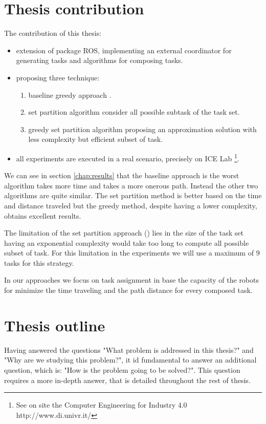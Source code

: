 \newpage
\section{Thesis contribution}
The contribution of this thesis:
\begin{itemize}
    \item extension of package ROS, implementing an external coordinator for generating tasks and algorithms for composing tasks.
    \item proposing three technique: 
    \begin{enumerate}
        \item baseline greedy approach \srst.
        \item set partition algorithm \sps consider all possible subtask of the task set.
        \item greedy set partition algorithm \gsp proposing an approximation solution with less complexity but efficient subset of task.
    \end{enumerate}
    \item all experiments are executed in a real scenario, precisely on ICE Lab \footnote{See on site the Computer Engineering for Industry 4.0 http://www.di.univr.it/}. 
\end{itemize}

We can see in section \ref{chap:results} that the baseline approach is
the worst algorithm takes more time and takes a more onerous path.
Instead the other two algorithms are quite similar. 
The set partition method is better based on the time and distance traveled but the greedy method,
despite having a lower complexity, obtains excellent results.

The limitation of the set partition approach (\sps) lies in the size of the task set having an exponential complexity
would take too long to compute all possible subset of task.
For this limitation in the experiments we will use a maximum of 9 tasks for this strategy. 

In our approaches we focus on task assignment in base the capacity of the robots for minimize the time traveling and the path distance for every composed task. 

\newpage
\section{Thesis outline}


Having answered the questions "What problem is addressed in this thesis?" and 
"Why are we studying this problem?", it id fundamental to answer an additional question,
which is: "How is the problem going to be solved?". This question requires a more 
in-depth answer, that is detailed throughout the rest of thesis.

